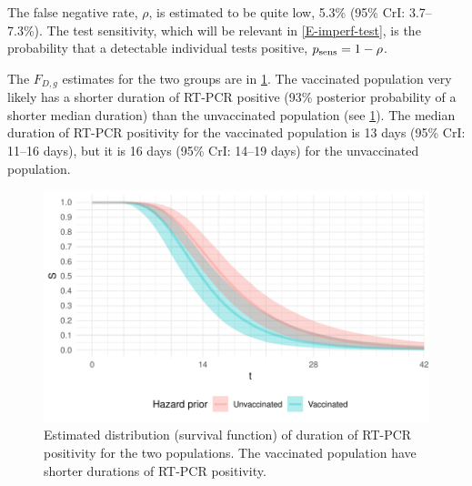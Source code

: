 \documentclass[thesis.tex]{subfiles}
\begin{document}
The false negative rate, $\rho$, is estimated to be quite low, 5.3\% (95\% CrI: 3.7--7.3\%).
The test sensitivity, which will be relevant in \cref{E-imperf-test}, is the probability that a detectable individual tests positive, $p_\text{sens} = 1 - \rho$.

The $F_{D,g}$ estimates for the two groups are in \cref{ATACCC:fig:duration}.
The vaccinated population very likely has a shorter duration of RT-PCR positive (93\% posterior probability of a shorter median duration) than the unvaccinated population (see \cref{ATACCC:fig:duration}).
The median duration of RT-PCR positivity for the vaccinated population is 13 days (95\% CrI: 11--16 days), but it is 16 days (95\% CrI: 14--19 days) for the unvaccinated population.
\begin{figure}
  \centering \includegraphics{ATACCC/duration}
  \caption[Duration of RT-PCR positivity.]{Estimated distribution (survival function) of duration of RT-PCR positivity for the two populations. The vaccinated population have shorter durations of RT-PCR positivity.  \label{ATACCC:fig:duration}}
\end{figure}
\end{document}
